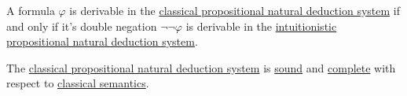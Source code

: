 \begin{theorem}\label{thm:glivenkos_double_negation_theorem}
  A formula \( \varphi \) is derivable in the \hyperref[def:classical_propositional_deductive_systems]{classical propositional natural deduction system} if and only if it's double negation \( \neg \neg \varphi \) is derivable in the \hyperref[def:intuitionistic_propositional_deductive_systems]{intuitionistic propositional natural deduction system}.
\end{theorem}

\begin{theorem}\label{thm:classical_propositional_logic_is_sound_and_complete}
  The \hyperref[def:classical_propositional_deductive_systems]{classical propositional natural deduction system} is \hyperref[def:derivability_and_satisfiability/soundness]{sound} and \hyperref[def:derivability_and_satisfiability/completeness]{complete} with respect to \hyperref[def:propositional_semantics]{classical semantics}.
\end{theorem}

\medskip

